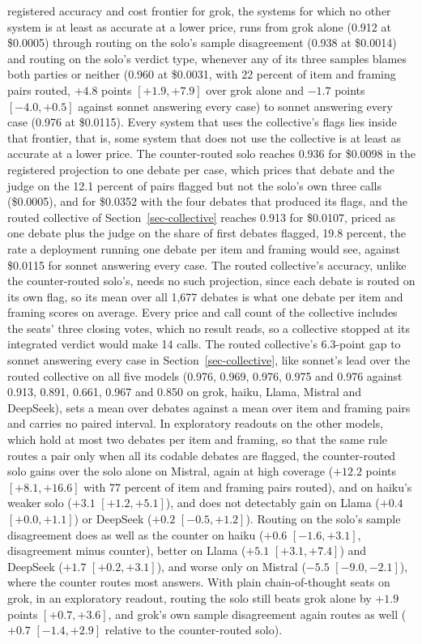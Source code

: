 registered accuracy and cost frontier for grok, the systems for which no
other system is at least as accurate at a lower price, runs from grok alone
(0.912 at \$0.0005) through routing on the solo's sample disagreement (0.938
at \$0.0014) and routing on the solo's verdict type, whenever any of its three
samples blames both parties or neither (0.960 at \$0.0031, with 22 percent of item and framing
pairs routed, $+4.8$ points $[+1.9, +7.9]$ over grok alone and $-1.7$ points
$[-4.0, +0.5]$ against sonnet answering every case) to sonnet answering every
case (0.976 at \$0.0115).
Every system that uses the collective's flags lies inside that
frontier, that is, some system that does not use the collective is at least
as accurate at a lower price. The counter-routed solo reaches 0.936 for
\$0.0098 in the registered projection to one debate per case, which prices
that debate and the judge on the 12.1 percent of pairs flagged but not the
solo's own three calls (\$0.0005), and for \$0.0352 with the four debates
that produced its flags, and the routed collective of
Section~\ref{sec-collective} reaches 0.913 for \$0.0107, priced as one debate
plus the judge on the share of first debates flagged, 19.8 percent, the rate a
deployment running one debate per item and framing would see, against
\$0.0115 for sonnet answering every case. The routed collective's accuracy,
unlike the counter-routed solo's, needs no such projection, since each debate
is routed on its own flag, so its mean over all 1,677 debates is what one
debate per item and framing scores on average.
Every price and call count of the collective includes the seats' three
closing votes, which no result reads, so a collective stopped at its
integrated verdict would make 14 calls.
The routed collective's 6.3-point gap to sonnet answering every case in
Section~\ref{sec-collective}, like sonnet's lead over the routed
collective on all five models (0.976, 0.969, 0.976, 0.975 and 0.976 against
0.913, 0.891, 0.661, 0.967 and 0.850 on grok, haiku, Llama, Mistral and
DeepSeek), sets a mean over debates against a mean over item and framing
pairs and carries no paired interval.
In exploratory readouts on the other models, which hold at most two debates
per item and framing, so that the same rule routes a pair only when all its
codable debates are flagged, the counter-routed solo gains over the solo
alone on Mistral, again at high coverage ($+12.2$ points $[+8.1, +16.6]$ with
77 percent of item and framing pairs routed), and on haiku's weaker solo
($+3.1$ $[+1.2, +5.1]$), and does not detectably gain on Llama ($+0.4$
$[+0.0, +1.1]$) or DeepSeek ($+0.2$ $[-0.5, +1.2]$). Routing on the solo's
sample disagreement does as well as the counter on haiku ($+0.6$
$[-1.6, +3.1]$, disagreement minus counter), better on Llama ($+5.1$
$[+3.1, +7.4]$) and DeepSeek ($+1.7$ $[+0.2, +3.1]$), and worse only on
Mistral ($-5.5$ $[-9.0, -2.1]$), where the counter routes most answers.
With plain chain-of-thought seats on grok, in an exploratory readout, routing
the solo still beats grok alone by $+1.9$ points $[+0.7, +3.6]$, and grok's
own sample disagreement again routes as well ($+0.7$ $[-1.4, +2.9]$ relative
to the counter-routed solo).

